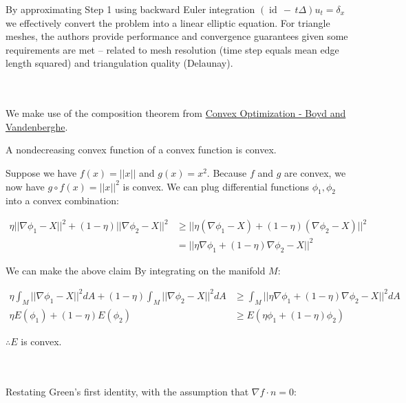 \documentclass{article}
\def\grad{\nabla}
\DeclareMathOperator{\id}{id}
\begin{document}
By approximating Step 1 using backward Euler integration $(\id \,-\, t\Delta)u_t = \delta_x$ we effectively convert the problem into a
linear elliptic equation. For triangle meshes, the authors provide performance and convergence guarantees given some requirements are met --
related to mesh resolution (time step equals mean edge length squared) and triangulation quality (Delaunay).


\vspace{1.8cm}
\\\\


We make use of the composition theorem from \href{https://web.stanford.edu/~boyd/cvxbook/}{Convex Optimization - Boyd and Vandenberghe}.\\

\begin{mdframed}
    A nondecreasing convex function of a convex function is convex.
\end{mdframed}

Suppose we have $f(x) = ||x||$ and $g(x) = x^2$. Because $f$ and $g$ are convex, we now have
$g \circ f(x) = ||x||^2$ is convex. We can plug differential functions $\phi_1, \phi_2$ into a convex combination:

\begin{align*}
    \eta || \grad \phi_1 - X ||^2 + (1 - \eta) || \grad \phi_2 - X ||^2 &\ge || \eta (\grad \phi_1 - X) + (1 - \eta) (\grad \phi_2 - X) ||^2 \\
        &= || \eta \grad \phi_1 + (1 - \eta) \grad \phi_2 - X ||^2 
\end{align*}

We can make the above claim By integrating on the manifold $M$:

\begin{align*}
    \eta \int_M || \grad \phi_1 - X ||^2 dA + (1 - \eta) \int_M || \grad \phi_2 - X ||^2 dA &\ge \int_M || \eta \grad \phi_1 + (1 - \eta) \grad \phi_2 - X ||^2 dA \\
    \eta E(\phi_1) + (1 - \eta)E(\phi_2) &\ge E(\eta\phi_1 + (1 - \eta)\phi_2)
\end{align*}

$\therefore E$ is convex.


\pagebreak
{}\\\\


Restating Green's first identity, with the assumption that $\grad f \cdot n = 0$:
\end{document}
